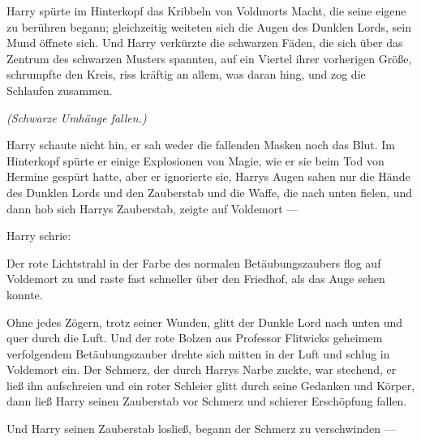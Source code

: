 Harry spürte im Hinterkopf das Kribbeln von Voldmorts Macht, die seine eigene zu berühren begann; gleichzeitig weiteten sich die Augen des Dunklen Lords, sein Mund öffnete sich.
Und Harry verkürzte die schwarzen Fäden, die sich über das Zentrum des schwarzen Musters spannten, auf ein Viertel ihrer vorherigen Größe, schrumpfte den Kreis, riss kräftig an allem, was daran hing, und zog die Schlaufen zusammen.

\emph{(Schwarze Umhänge fallen.)}

Harry schaute nicht hin, er sah weder die fallenden Masken noch das Blut. Im Hinterkopf spürte er einige Explosionen von Magie, wie er sie beim Tod von Hermine gespürt hatte, aber er ignorierte sie, Harrys Augen sahen nur die Hände des Dunklen Lords und den Zauberstab und die Waffe, die nach unten fielen, und dann hob sich Harrys Zauberstab, zeigte auf Voldemort —

Harry schrie: 

Der rote Lichtstrahl in der Farbe des normalen Betäubungszaubers flog auf Voldemort zu und raste fast schneller über den Friedhof, als das Auge sehen konnte.

Ohne jedes Zögern, trotz seiner Wunden, glitt der Dunkle Lord nach unten und quer durch die Luft. Und der rote Bolzen aus Professor Flitwicks geheimem verfolgendem Betäubungszauber drehte sich mitten in der Luft und schlug in Voldemort ein.
Der Schmerz, der durch Harrys Narbe zuckte, war stechend, er ließ ihn aufschreien und ein roter Schleier glitt durch seine Gedanken und Körper, dann ließ Harry seinen Zauberstab vor Schmerz und schierer Erschöpfung fallen.

Und Harry seinen Zauberstab losließ, begann der Schmerz zu verschwinden —

